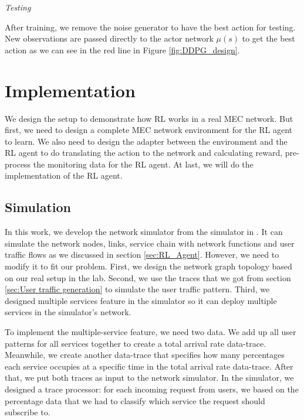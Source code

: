 \documentclass[conference]{IEEEtran}
\begin{document}
\textit{Testing}

After training, we remove the noise generator to have the best action for testing. New observations are passed directly to the actor network $\mu(s)$ to get the best action as we can see in the red line in Figure \ref{fig:DDPG_design}.


\section{Implementation}
\label{sec:Implementation}
We design the setup to demonstrate how RL works in a real MEC network. But first, we need to design a complete MEC network environment for the RL agent to learn. We also need to design the adapter between the environment and the RL agent to do translating the action to the network and calculating reward, pre-process the monitoring data for the RL agent. At last, we will do the implementation of the RL agent.

\subsection{Simulation}
In this work, we develop the network simulator from the simulator in \cite{9269087}. It can simulate the network nodes, links, service chain with network functions and user traffic flows as we discussed in section \ref{sec:RL_Agent}. However, we need to modify it to fit our problem. First, we design the network graph topology based on our real setup in the lab. Second, we use the traces that we got from section \ref{sec:User traffic generation} to simulate the user traffic pattern. Third, we designed multiple services feature in the simulator so it can deploy multiple services in the simulator's network. 

To implement the multiple-service feature, we need two data. We add up all user patterns for all services together to create a total arrival rate data-trace. Meanwhile, we create another data-trace that specifies how many percentages each service occupies at a specific time in the total arrival rate data-trace. After that, we put both traces as input to the network simulator. In the simulator, we designed a trace processor: for each incoming request from users, we based on the percentage data that we had to classify which service the request should subscribe to.

\end{document}
